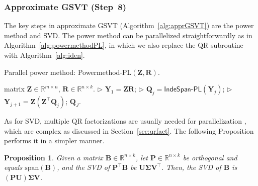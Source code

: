 \documentclass[10pt,journal,compsoc]{IEEEtran}
\newtheorem{prop}[theorem]{Proposition}
\def \R{\mathbb R}
\newcommand{\Span}[1]{\text{span}(#1)}
\begin{document}
\subsubsection{Approximate GSVT (Step~8)}
\label{sec:inexactps}

The key steps in approximate GSVT (Algorithm~\ref{alg:apprGSVT}) are the power method and SVD.
The power method can be parallelized straightforwardly as in
Algorithm~\ref{alg:powermethodPL}, in which we also replace the \textsf{QR} subroutine with Algorithm~\ref{alg:iden}.

\begin{algorithm}[ht]
\caption{Parallel power method:
		\textsf{Powermethod-PL}$(\mathbf{Z}, \mathbf{R})$.}
	\begin{algorithmic}[1]
		\REQUIRE matrix $\mathbf{Z} \in \R^{m \times n}$, $\mathbf{R} \in \R^{n \times k}$.
		\STATE $\rhd$ $\mathbf{Y}_1 = \mathbf{Z} \mathbf{R}$;
		\STATE $\rhd$ $\mathbf{Q}_{j} = \textsf{IndeSpan-PL}(\mathbf{Y}_j)$;  
		\STATE $\rhd$ $\mathbf{Y}_{j + 1} = \mathbf{Z} (\mathbf{Z}^{\top} \mathbf{Q}_{j})$;
		\ENDFOR
		\RETURN $\mathbf{Q}_{J}$. 
	\end{algorithmic}
	\label{alg:powermethodPL}
\end{algorithm}

As for SVD, multiple QR factorizations are usually needed for parallelization \cite{bertsekas1997parallel}, 
	which are complex as discussed in Section~\ref{sec:qrfact}.
The following Proposition performs it in a simpler manner.




\begin{prop} \label{pr:rsvd}
Given 
a matrix $\mathbf{B} \in \R^{n \times k}$,
let $\mathbf{P}  \in \R^{n \times k}$ be orthogonal and equals $\Span{\mathbf{B}}$, 
and the SVD of $\mathbf{P}^{\top} \mathbf{B}$ be $\mathbf{U} \mathbf{\Sigma} \mathbf{V}^{\top}$.
Then, 
the SVD of $\mathbf{B}$ is
$(\mathbf{P} \mathbf{U})\mathbf{\Sigma}\mathbf{V}$.
\end{prop}
\end{document}
